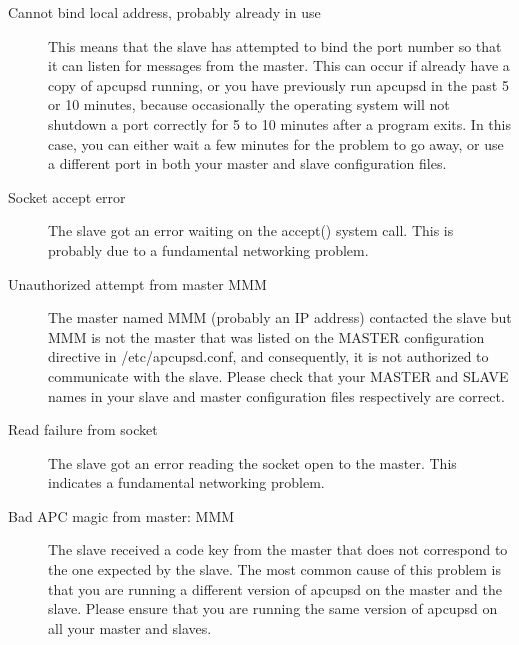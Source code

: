 {{{{{{{{\begin{description}
\item[Cannot bind local address, probably already in use]
   \label{Cannot-bind-local-address_003b-probably-already-in-use}
This means that the slave has attempted to bind the port number so that it can
listen for messages from the master. This can occur if already have a copy of
apcupsd running, or you have previously run apcupsd in the past 5 or 10
minutes, because occasionally the operating system will not shutdown a port
correctly for 5 to 10 minutes after a program exits. In this case, you can
either wait a few minutes for the problem to go away, or use a different port
in both your master and slave configuration files. 

\item[Socket accept error]
   \label{Socket-accept-error}
The slave got an error waiting on the accept() system call. This is probably
due to a fundamental networking problem. 

\item[Unauthorized attempt from master MMM]
   \label{Unauthorized-attempt-from-master-MMM}
The master named MMM (probably an IP address) contacted the slave but MMM is
not the master that was listed on the MASTER configuration directive in
/etc/apcupsd.conf, and consequently, it is not authorized to communicate with
the slave. Please check that your MASTER and SLAVE names in your slave and
master configuration files respectively are correct. 

\item[Read failure from socket]
   \label{Read-failure-from-socket}
The slave got an error reading the socket open to the master. This indicates a
fundamental networking problem. 

\item[Bad APC magic from master: MMM]
   \label{Bad-APC-magic-from-master_003b-MMM}
The slave received a code key from the master that does not correspond to the
one expected by the slave. The most common cause of this problem is that you
are running a different version of apcupsd on the master and the slave. Please
ensure that you are running the same version of apcupsd on all your master and
slaves. 


\end{description}}}}}}}}}
